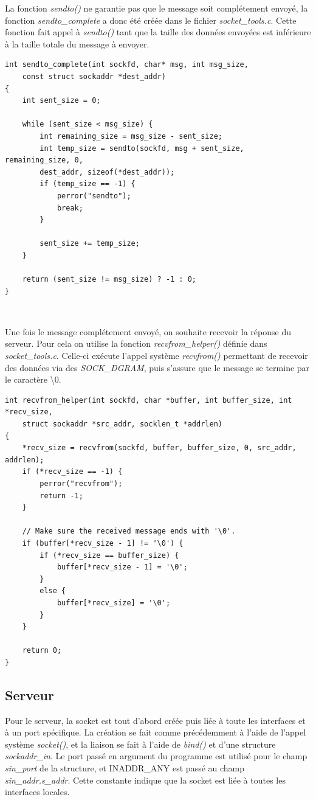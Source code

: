 La fonction \emph{sendto()} ne garantie pas que le message soit complétement envoyé, la fonction \emph{sendto\_complete} a donc été créée dans le fichier \emph{socket\_tools.c}. Cette fonction fait appel à \emph{sendto()} tant que la taille des données envoyées est inférieure à la taille totale du message à envoyer.

\begin{lstlisting}
int sendto_complete(int sockfd, char* msg, int msg_size,
    const struct sockaddr *dest_addr)
{
    int sent_size = 0;

    while (sent_size < msg_size) {
        int remaining_size = msg_size - sent_size;
        int temp_size = sendto(sockfd, msg + sent_size, remaining_size, 0,
        dest_addr, sizeof(*dest_addr));
        if (temp_size == -1) {
            perror("sendto");
            break;
        }

        sent_size += temp_size;
    }

    return (sent_size != msg_size) ? -1 : 0;
}
\end{lstlisting}
\

Une fois le message complétement envoyé, on souhaite recevoir la réponse du serveur. Pour cela on utilise la fonction \emph{recvfrom\_helper()} définie dans \emph{socket\_tools.c}. Celle-ci exécute l'appel système \emph{recvfrom()} permettant de recevoir des données via des \emph{SOCK\_DGRAM}, puis s'assure que le message se termine par le caractère \textbackslash 0.

\begin{lstlisting}
int recvfrom_helper(int sockfd, char *buffer, int buffer_size, int *recv_size,
    struct sockaddr *src_addr, socklen_t *addrlen)
{
    *recv_size = recvfrom(sockfd, buffer, buffer_size, 0, src_addr, addrlen);
    if (*recv_size == -1) {
        perror("recvfrom");
        return -1;
    }

    // Make sure the received message ends with '\0'.
    if (buffer[*recv_size - 1] != '\0') {
        if (*recv_size == buffer_size) {
            buffer[*recv_size - 1] = '\0';
        }
        else {
            buffer[*recv_size] = '\0';
        }
    }

    return 0;
}
\end{lstlisting}

\subsection{Serveur}
Pour le serveur, la socket est tout d'abord créée puis liée à toute les interfaces et à un port spécifique. La création se fait comme précédemment à l'aide de l'appel système \emph{socket()}, et la liaison se fait à l'aide de \emph{bind()} et d'une structure \emph{sockaddr\_in}. Le port passé en argument du programme est utilisé pour le champ \emph{sin\_port} de la structure, et INADDR\_ANY est passé au champ \emph{sin\_addr.s\_addr}. Cette constante indique que la socket est liée à toutes les interfaces locales. \cite{cite:cmu_edu_inaddr_any} \cite{cite:man_ip}

